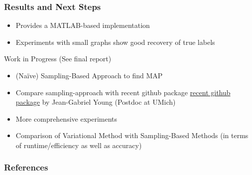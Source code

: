 \documentclass{beamer}
\newcommand{\1}{\mathbbm{1}}
\begin{document}
\begin{frame}
  \frametitle{Results and Next Steps}
  \begin{itemize}
  \item \parencite{aicher_learning_2015} Provides a MATLAB-based implementation
  \item Experiments with small graphs show good recovery of true labels
  \end{itemize}

  \begin{block}{Work in Progress (See final report)}
    \begin{itemize}
    \item (Na\"ive) Sampling-Based Approach to find MAP
    \item Compare sampling-approach with recent github package \href{{https://github.com/jg-you/sbm_canonical_mcmc/}}{recent github package} by Jean-Gabriel Young (Postdoc at UMich)
    \item More comprehensive experiments
    \item Comparison of Variational Method with Sampling-Based Methods (in terms of runtime/efficiency as well as accuracy)
    \end{itemize}
  \end{block}

\end{frame}


\begin{frame}[allowframebreaks]
  \frametitle{References}
  \printbibliography{}
  
\end{frame}
\end{document}
